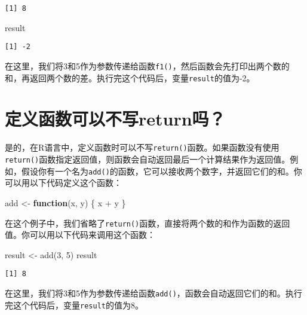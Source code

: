 \documentclass[
  letterpaper,
  DIV=11,
  numbers=noendperiod]{scrreprt}
\newenvironment{Shaded}{\begin{snugshade}}{\end{snugshade}}
\newcommand{\ControlFlowTok}[1]{\textcolor[rgb]{0.00,0.23,0.31}{\textbf{#1}}}
\newcommand{\DecValTok}[1]{\textcolor[rgb]{0.68,0.00,0.00}{#1}}
\newcommand{\FunctionTok}[1]{\textcolor[rgb]{0.28,0.35,0.67}{#1}}
\newcommand{\NormalTok}[1]{\textcolor[rgb]{0.00,0.23,0.31}{#1}}
\newcommand{\OtherTok}[1]{\textcolor[rgb]{0.00,0.23,0.31}{#1}}
\newcommand{\SpecialCharTok}[1]{\textcolor[rgb]{0.37,0.37,0.37}{#1}}
\begin{document}
\begin{verbatim}
[1] 8
\end{verbatim}

\begin{Shaded}
\begin{Highlighting}[]
\NormalTok{result}
\end{Highlighting}
\end{Shaded}

\begin{verbatim}
[1] -2
\end{verbatim}

在这里，我们将3和5作为参数传递给函数\texttt{f1()}，然后函数会先打印出两个数的和，再返回两个数的差。执行完这个代码后，变量\texttt{result}的值为-2。

\section{定义函数可以不写return吗？}\label{ux5b9aux4e49ux51fdux6570ux53efux4ee5ux4e0dux5199returnux5417}

是的，在R语言中，定义函数时可以不写\texttt{return()}函数。如果函数没有使用\texttt{return()}函数指定返回值，则函数会自动返回最后一个计算结果作为返回值。例如，假设你有一个名为\texttt{add()}的函数，它可以接收两个数字，并返回它们的和。你可以用以下代码定义这个函数：

\begin{Shaded}
\begin{Highlighting}[]
\NormalTok{add }\OtherTok{\textless{}{-}} \ControlFlowTok{function}\NormalTok{(x, y) \{}
\NormalTok{ x }\SpecialCharTok{+}\NormalTok{ y}
\NormalTok{\}}
\end{Highlighting}
\end{Shaded}

在这个例子中，我们省略了\texttt{return()}函数，直接将两个数的和作为函数的返回值。你可以用以下代码来调用这个函数：

\begin{Shaded}
\begin{Highlighting}[]
\NormalTok{result }\OtherTok{\textless{}{-}} \FunctionTok{add}\NormalTok{(}\DecValTok{3}\NormalTok{, }\DecValTok{5}\NormalTok{)}
\NormalTok{result}
\end{Highlighting}
\end{Shaded}

\begin{verbatim}
[1] 8
\end{verbatim}

在这里，我们将3和5作为参数传递给函数\texttt{add()}，函数会自动返回它们的和。执行完这个代码后，变量\texttt{result}的值为8。
\end{document}
